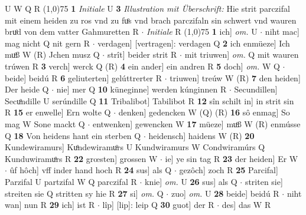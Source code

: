 \documentclass[8pt,a4paper,notitlepage]{article}
\begin{document}
\begin{table}[ht]
\begin{minipage}[t]{0.5\linewidth}
U W Q R \newline
\line(1,0){75} \newline
\textbf{1} \textit{Initiale} U  \textbf{3} \textit{Illustration mit Überschrift:} Hie strit parczifal mit einem heiden zu ros vnd zu fuͦs vnd brach parczifaln sin schwert vnd wauren bruͦd von dem vatter Gahmuretten R   $\cdot$ \textit{Initiale} R  \newline
\line(1,0){75} \newline
\textbf{1} ich] \textit{om.} U  $\cdot$ niht mac] mag nicht Q nit gern R  $\cdot$ verdagen] [vertragen]: verdagen Q \textbf{2} ich enmüeze] Ich muͦß W (R) Jchen musz Q  $\cdot$ strît] beider strit R  $\cdot$ mit triuwen] \textit{om.} Q mit wauren trúwen R \textbf{3} verch] werck Q (R) \textbf{4} ein ander] ein andren R \textbf{5} doch] \textit{om.} W Q  $\cdot$ beide] beidú R \textbf{6} geliuterten] gelúttrerter R  $\cdot$ triuwen] treúw W (R) \textbf{7} den heiden] Der heide Q  $\cdot$ nie] mer Q \textbf{10} küneginne] werden kúnginnen R  $\cdot$ Secundillen] Secuͦndille U serúndille Q \textbf{11} Tribalibot] Tabilibot R \textbf{12} sîn schilt in] in strit sin R \textbf{15} er enwelle] Ern wolte Q  $\cdot$ denken] gedencken W (Q) (R) \textbf{16} sô enmag] So mag W Sone mackt Q  $\cdot$ entwenken] gewencken W \textbf{17} müeze] muͦß W (R) enmússe Q \textbf{18} Von heidens hant ein sterben Q  $\cdot$ heidensch] haidens W (R) \textbf{20} Kundewiramurs] Kuͦndewiramuͦrs U Kundwiramurs W Condwiramúrs Q Kunduwiramuͦrs R \textbf{22} grœsten] grossen W  $\cdot$ ie] ye sin tag R \textbf{23} der heiden] Er W  $\cdot$ ûf hôch] vff inder hand hoch R \textbf{24} sus] als Q  $\cdot$ gezôch] zoch R \textbf{25} Parcifal] Parzifal U partzifal W Q parczifal R  $\cdot$ knie] \textit{om.} U \textbf{26} sus] als Q  $\cdot$ striten sie] streiten sie Q stritten sy hie R \textbf{27} si] \textit{om.} Q  $\cdot$ zuo] \textit{om.} U \textbf{28} beide] beidú R  $\cdot$ niht wan] nun R \textbf{29} ich] ist R  $\cdot$ lîp] [lip]: leip Q \textbf{30} guot] der R  $\cdot$ des] das W R \newline
\end{minipage}
\end{table}
\end{document}
